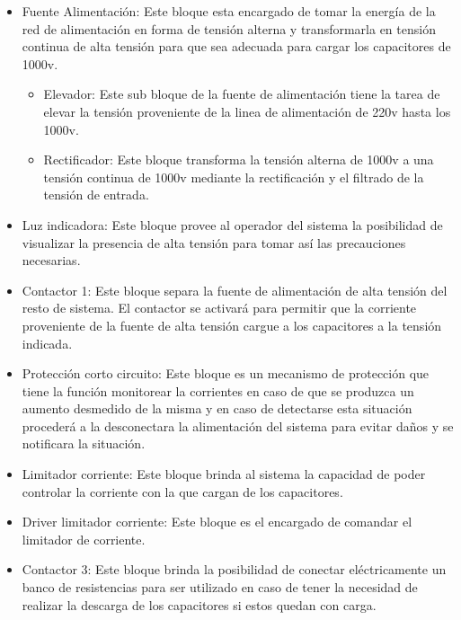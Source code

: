 \documentclass[12pt]{article}
\begin{document}
  \begin{itemize}
    \item Fuente Alimentación: Este bloque esta encargado de tomar la energía de la red de alimentación en forma de tensión alterna y transformarla en 
				tensión continua de alta tensión para que sea adecuada para cargar los capacitores de 1000v. 
    \begin{itemize}
      \item Elevador: Este sub bloque de la fuente de alimentación tiene la tarea de elevar la tensión proveniente de la linea de alimentación de 220v 
		      hasta los 1000v.
      \item Rectificador: Este bloque transforma la tensión alterna de 1000v a una tensión continua de 1000v mediante la rectificación y el filtrado de la tensión
			  de entrada.
    \end{itemize}

    \item Luz indicadora: Este bloque provee al operador del sistema la posibilidad de visualizar la presencia de alta tensión para tomar así las precauciones necesarias.
    
    \item Contactor 1: Este bloque separa la fuente de alimentación de alta tensión del resto de sistema. El contactor se activará para permitir que la corriente
		      proveniente de la fuente de alta tensión cargue a los capacitores a la tensión indicada.
    
    \item Protección corto circuito: Este bloque es un mecanismo de protección que tiene la función monitorear la corrientes en caso de que se produzca un aumento
				      desmedido de la misma y en caso de detectarse esta situación procederá a la desconectara la alimentación del sistema
				      para evitar daños y se notificara la situación.
    
    \item Limitador corriente: Este bloque brinda al sistema la capacidad de poder controlar la corriente con la que cargan de los capacitores.
    
    \item Driver limitador corriente: Este bloque es el encargado de comandar el limitador de corriente.

    \item Contactor 3: Este bloque brinda la posibilidad de conectar eléctricamente un banco de resistencias para ser utilizado en caso de tener la necesidad de
			realizar la descarga de los capacitores si estos quedan con carga.


\end{itemize}
\end{document}
